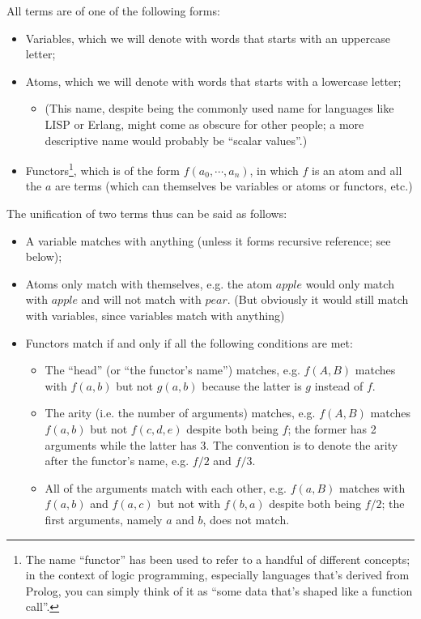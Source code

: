 All terms are of one of the following forms:

\begin{itemize}
	\item Variables, which we will denote with words that starts with an uppercase letter;
	\item Atoms, which we will denote with words that starts with a lowercase letter;
	\begin{itemize}
		\item (This name, despite being the commonly used name for languages like LISP or Erlang, might come as obscure for other people; a more descriptive name would probably be ``scalar values''.)
	\end{itemize}
	\item Functors\footnote{The name ``functor'' has been used to refer to a handful of different concepts; in the context of logic programming, especially languages that's derived from Prolog, you can simply think of it as ``some data that's shaped like a function call''.}, which is of the form \(f(a_0,\cdots,a_n)\), in which \(f\) is an atom and all the \(a\) are terms (which can themselves be variables or atoms or functors, etc.)
\end{itemize}

The unification of two terms thus can be said as follows:

\begin{itemize}
	\item A variable matches with anything (unless it forms recursive reference; see below);
	\item Atoms only match with themselves, e.g. the atom $apple$ would only match with $apple$ and will not match with $pear$. (But obviously it would still match with variables, since variables match with anything)
	\item Functors match if and only if all the following conditions are met:
	\begin{itemize}
		\item The ``head'' (or ``the functor's name'') matches, e.g. \(f(A,B)\) matches with \(f(a,b)\) but not \(g(a,b)\) because the latter is \(g\) instead of \(f\).
		\item The arity (i.e. the number of arguments) matches, e.g. \(f(A,B)\) matches \(f(a,b)\) but not \(f(c,d,e)\) despite both being \(f\); the former has 2 arguments while the latter has 3. The convention is to denote the arity after the functor's name, e.g. \(f/2\) and \(f/3\).
		\item All of the arguments match with each other, e.g. \(f(a, B)\) matches with \(f(a, b)\) and \(f(a, c)\) but not with \(f(b, a)\) despite both being \(f/2\); the first arguments, namely \(a\) and \(b\), does not match.
	\end{itemize}
\end{itemize}

